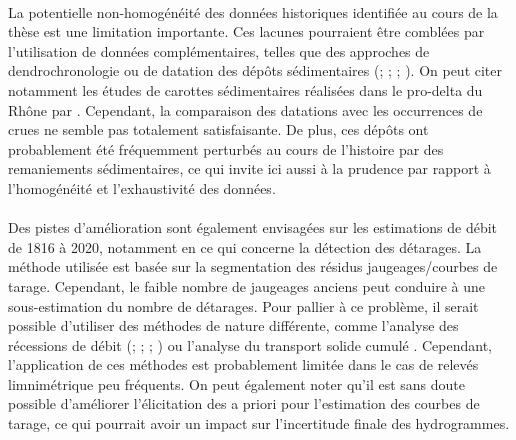 	\paragraph{} La potentielle non-homogénéité des données historiques identifiée au cours de la thèse est une limitation importante. Ces lacunes pourraient être comblées par l'utilisation de données complémentaires, telles que des approches de dendrochronologie \citep{ballesteros-canovas_review_2015} ou de datation des dépôts sédimentaires (\cite{dezileau_multidating_2014}; \cite{engeland_new_2020}; \cite{corella_1400-years_2021}; \cite{wilhelm_reconstructing_2022}). On peut citer notamment les études de carottes sédimentaires réalisées dans le pro-delta du Rhône par \citet{fanget_historical_2013}. Cependant, la comparaison des datations avec les occurrences de crues ne semble pas totalement satisfaisante. De plus, ces dépôts ont probablement été fréquemment perturbés au cours de l'histoire par des remaniements sédimentaires, ce qui invite ici aussi à la prudence par rapport à l'homogénéité et l'exhaustivité des données. 
	
	\paragraph{} Des pistes d'amélioration sont également envisagées sur les estimations de débit de 1816 à 2020, notamment en ce qui concerne la détection des détarages. La méthode utilisée est basée sur la segmentation des résidus jaugeages/courbes de tarage. Cependant, le faible nombre de jaugeages anciens peut conduire à une sous-estimation du nombre de détarages. Pour pallier à ce problème, il serait possible d'utiliser des méthodes de nature différente, comme l'analyse des récessions de débit (\cite{vogel_estimation_1996}; \cite{chapman_comparison_1999}; \cite{lang_extrapolation_2010}; \cite{darienzo_detection_2021-1}) ou l'analyse du transport solide cumulé \citep{darienzo_detection_2021-1}. Cependant, l'application de ces méthodes est probablement limitée dans le cas de relevés limnimétrique peu fréquents. On peut également noter qu'il est sans doute possible d'améliorer l'élicitation des a priori pour l'estimation des courbes de tarage, ce qui pourrait avoir un impact sur l'incertitude finale des hydrogrammes.	
		
